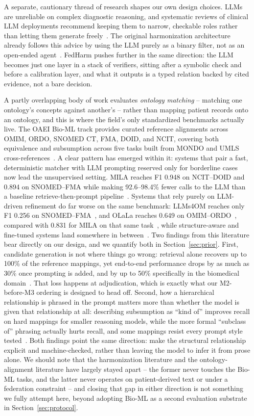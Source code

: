 \documentclass[conference]{IEEEtran}
\begin{document}
A separate, cautionary thread of research shapes our own design choices. LLMs are unreliable on complex diagnostic reasoning, and systematic reviews of clinical LLM deployments recommend keeping them to narrow, checkable roles rather than letting them generate freely~\cite{b45,b44}. The original harmonization architecture already follows this advice by using the LLM purely as a binary filter, not as an open-ended agent~\cite{b1}. FedHarm pushes further in the same direction: the LLM becomes just one layer in a stack of verifiers, sitting after a symbolic check and before a calibration layer, and what it outputs is a typed relation backed by cited evidence, not a bare decision.

A partly overlapping body of work evaluates \emph{ontology matching} -- matching one ontology's concepts against another's -- rather than mapping patient records onto an ontology, and this is where the field's only standardized benchmarks actually live. The OAEI Bio-ML track provides curated reference alignments across OMIM, ORDO, SNOMED CT, FMA, DOID, and NCIT, covering both equivalence and subsumption across five tasks built from MONDO and UMLS cross-references~\cite{b55}. A clear pattern has emerged within it: systems that pair a fast, deterministic matcher with LLM prompting reserved only for borderline cases now lead the unsupervised setting. MILA reaches F1 0.948 on NCIT--DOID and 0.894 on SNOMED--FMA while making 92.6--98.4\% fewer calls to the LLM than a baseline retrieve-then-prompt pipeline~\cite{b54}. Systems that rely purely on LLM-driven refinement do far worse on the same benchmark: LLMs4OM reaches only F1 0.256 on SNOMED--FMA~\cite{b56}, and OLaLa reaches 0.649 on OMIM--ORDO~\cite{b57}, compared with 0.831 for MILA on that same task~\cite{b54}, while structure-aware and fine-tuned systems land somewhere in between~\cite{b58,b59,b61}. Two findings from this literature bear directly on our design, and we quantify both in Section~\ref{sec:prior}. First, candidate generation is not where things go wrong: retrieval alone recovers up to 100\% of the reference mappings, yet end-to-end performance drops by as much as 30\% once prompting is added, and by up to 50\% specifically in the biomedical domain~\cite{b54}. That loss happens at adjudication, which is exactly what our M2-before-M3 ordering is designed to head off. Second, how a hierarchical relationship is phrased in the prompt matters more than whether the model is given that relationship at all: describing subsumption as ``kind of'' improves recall on hard mappings for smaller reasoning models, while the more formal ``subclass of'' phrasing actually hurts recall, and some mappings resist every prompt style tested~\cite{b60}. Both findings point the same direction: make the structural relationship explicit and machine-checked, rather than leaving the model to infer it from prose alone. We should note that the harmonization literature and the ontology-alignment literature have largely stayed apart -- the former never touches the Bio-ML tasks, and the latter never operates on patient-derived text or under a federation constraint -- and closing that gap in either direction is not something we fully attempt here, beyond adopting Bio-ML as a second evaluation substrate in Section~\ref{sec:protocol}.
\end{document}
